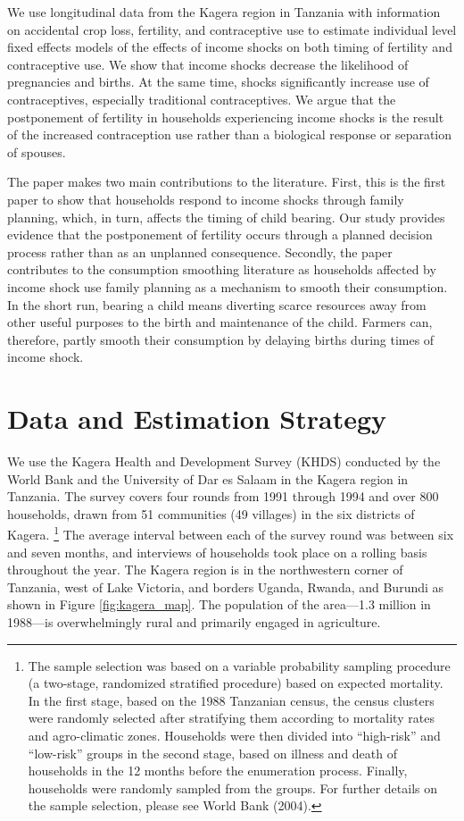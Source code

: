 \documentclass[letterpaper,12pt]{article}
\begin{document}
We use longitudinal data from the Kagera region in Tanzania with information on accidental 
crop loss, fertility, and contraceptive use to estimate individual level fixed 
effects models of the effects of income shocks on both timing of fertility and 
contraceptive use.
We show that income shocks decrease the likelihood of pregnancies and births.
At the same time, shocks significantly increase use of contraceptives, 
especially traditional contraceptives.
We argue that the postponement of fertility in households experiencing income 
shocks is the result of the increased contraception use rather than a biological 
response or separation of spouses.

The paper makes two main contributions to the literature. 
First, this is the first paper to show that households respond to income shocks 
through family planning, which, in turn, affects the timing of child bearing. 
Our study provides evidence that the postponement of fertility occurs through a 
planned decision process rather than as an unplanned consequence.
Secondly, the paper contributes to the consumption smoothing literature as households 
affected by income shock use family planning as a mechanism to smooth their consumption. 
In the short run, bearing a child means diverting scarce resources away from other
useful purposes to the birth and maintenance of the child. 
Farmers can, therefore, partly smooth their consumption by delaying births during 
times of income shock.



\section{Data and Estimation Strategy}

We use the Kagera Health and Development Survey (KHDS) conducted by the World Bank 
and the University of Dar es Salaam in the Kagera region in Tanzania. 
The survey covers four rounds from 1991 through 1994 and over 800 households, 
drawn from 51 communities (49 villages) in the six districts of Kagera.%
\footnote{
The sample selection was based on a variable probability sampling procedure 
(a two-stage, randomized stratified procedure) based on expected mortality.
In the first stage, based on the 1988 Tanzanian census, the census clusters were randomly 
selected after stratifying them according to mortality rates and agro-climatic zones. 
Households were then divided into ``high-risk'' and ``low-risk'' groups in the 
second stage, based on illness and death of households in the 12 months 
before the enumeration process.
Finally, households were randomly sampled from the groups.
For further details on the sample selection, please see World Bank (2004).
}
The average interval between each of the survey round was between six and seven months, 
and interviews of households took place on a rolling basis throughout the year. 
The Kagera region is in the northwestern corner of Tanzania, west of Lake Victoria, and 
borders Uganda, Rwanda, and Burundi as shown in Figure \ref{fig:kagera_map}. 
The population of the area---1.3 million in 1988---is 
overwhelmingly rural and primarily engaged in agriculture. 
\end{document}
